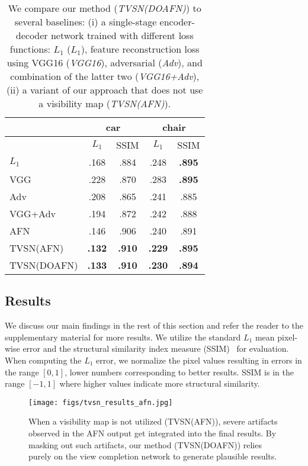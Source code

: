 \documentclass[10pt,twocolumn,letterpaper]{article}
\begin{document}
\begin{table}[]
\centering
\caption{We compare our method (\emph{TVSN(DOAFN)}) to several baselines: (i) a single-stage encoder-decoder network trained with different loss functions: $L_1$ (\emph{$L_1$}), feature reconstruction loss using VGG16 (\emph{VGG16}), adversarial (\emph{Adv}), and combination of the latter two (\emph{VGG16+Adv}), (ii) a variant of our approach that does not use a visibility map (\emph{TVSN(AFN)}).}
\label{tabel:quant}
\begin{tabular}{l|cc|cc}
                  & \multicolumn{2}{c}{car} & \multicolumn{2}{|c}{chair} \\ \hline
                  & $L_1$     & SSIM   & $L_1$      & SSIM   \\ \hline
$L_1$\cite{tatarchenko_eccv2016}                & .168  & .884  & .248   & \textbf{.895} \\
VGG               & .228  & .870  & .283   & \textbf{.895} \\
Adv               & .208  & .865  & .241   & .885 \\
VGG+Adv           & .194  & .872  & .242   & .888 \\
AFN\cite{Zhou_eccv2016}               & .146  & .906  & .240   & .891 \\
TVSN(AFN)         & \textbf{.132} & \textbf{.910} & \textbf{.229} & \textbf{.895}  \\
TVSN(DOAFN)       & \textbf{.133} & \textbf{.910} & \textbf{.230} & \textbf{.894}  \\
\end{tabular}
\vspace{-2mm}
\vspace{-2mm}
\end{table}


\subsection{Results}
We discuss our main findings in the rest of this section and refer the reader to the supplementary material for more results.
%
We utilize the standard $L_1$ mean pixel-wise error and the structural similarity index measure (SSIM)~\cite{Wang04imagequality,mathieu_iclr2016} for evaluation. When computing the $L_1$ error, we normalize the pixel values resulting in errors in the range $[0,1]$, lower numbers corresponding to better results. SSIM is in the range $[-1,1]$ where higher values indicate more structural similarity.

\label{sec:tvsn_results_afn}
\vspace{-2mm}
\begin{figure}[thbp]
\begin{center}
\texttt{[image: figs/tvsn\_results\_afn.jpg]}
\end{center}
\caption{When a visibility map is not utilized (TVSN(AFN)), severe artifacts observed in the AFN output get integrated into the final results. By masking out such artifacts, our method (TVSN(DOAFN)) relies purely on the view completion network to generate plausible results.}
\label{fig:tvsn_results_afn}
\vspace{-3mm}
\end{figure}
\end{document}
